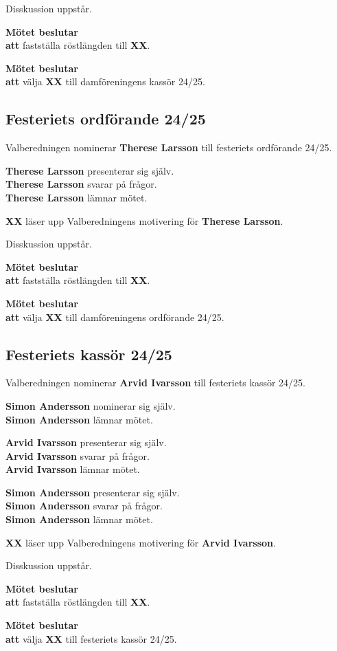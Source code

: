 \documentclass{datateknologsektionen-document}
\newcommand{\ind}{\hspace*{2em}}
\newcommand{\motetbeslutar}{\textbf{Mötet beslutar}}
\newcommand{\att}{\\\ind\textbf{att}}
\newcommand{\rostlangd}[1]{\motetbeslutar\att{} fastställa röstlängden till \textbf{#1}.}
\begin{document}
Disskussion uppstår.

\rostlangd{XX}

\motetbeslutar\att{} välja \textbf{XX} till damföreningens kassör 24/25.

\subsection{Festeriets ordförande 24/25}

Valberedningen nominerar \textbf{Therese Larsson} till festeriets ordförande 24/25.

\textbf{Therese Larsson} presenterar sig själv.\\
\textbf{Therese Larsson} svarar på frågor.\\
\textbf{Therese Larsson} lämnar mötet.

\textbf{XX} läser upp Valberedningens motivering för \textbf{Therese Larsson}.

Disskussion uppstår.

\rostlangd{XX}

\motetbeslutar\att{} välja \textbf{XX} till damföreningens ordförande 24/25.

\subsection{Festeriets kassör 24/25}

Valberedningen nominerar \textbf{Arvid Ivarsson} till festeriets kassör 24/25.

\textbf{Simon Andersson} nominerar sig själv. \\
\textbf{Simon Andersson} lämnar mötet.

\textbf{Arvid Ivarsson} presenterar sig själv.\\
\textbf{Arvid Ivarsson} svarar på frågor.\\
\textbf{Arvid Ivarsson} lämnar mötet.

\textbf{Simon Andersson} presenterar sig själv.\\
\textbf{Simon Andersson} svarar på frågor.\\
\textbf{Simon Andersson} lämnar mötet.

\textbf{XX} läser upp Valberedningens motivering för \textbf{Arvid Ivarsson}.

Disskussion uppstår.

\rostlangd{XX}

\motetbeslutar\att{} välja \textbf{XX} till festeriets kassör 24/25.

\pagebreak
\end{document}
